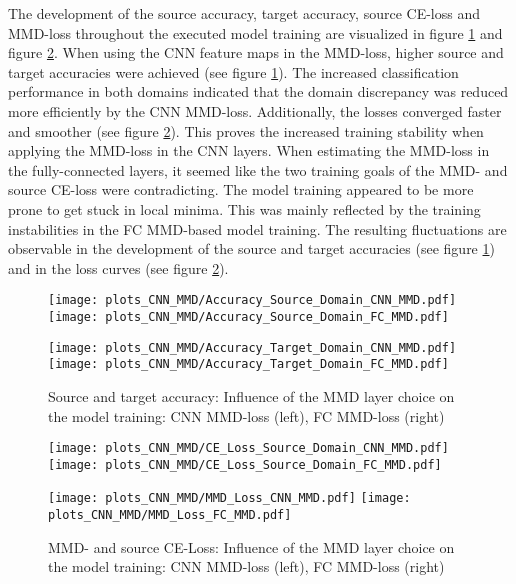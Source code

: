 The development of the source accuracy, target accuracy, source CE-loss and MMD-loss throughout the executed model training are visualized in figure \ref{fig:accuracy_cnn_and_no_cnn_mmd} and figure \ref{fig:loss_cnn_and_no_cnn_mmd}. When using the CNN feature maps in the MMD-loss, higher source and target accuracies were achieved (see figure \ref{fig:accuracy_cnn_and_no_cnn_mmd}). The increased classification performance in both domains indicated that the domain discrepancy was reduced more efficiently by the CNN MMD-loss. Additionally, the losses converged faster and smoother (see figure \ref{fig:loss_cnn_and_no_cnn_mmd}). This proves the increased training stability when applying the MMD-loss in the CNN layers. When estimating the MMD-loss in the fully-connected layers, it seemed like the two training goals of the MMD- and source CE-loss were contradicting. The model training appeared to be more prone to get stuck in local minima. This was mainly reflected by the training instabilities in the FC MMD-based model training. The resulting fluctuations are observable in the development of the source and target accuracies (see figure \ref{fig:accuracy_cnn_and_no_cnn_mmd}) and in the loss curves (see figure \ref{fig:loss_cnn_and_no_cnn_mmd}).

\begin{figure}[htp]
  \centering
  \texttt{[image: plots\_CNN\_MMD/Accuracy\_Source\_Domain\_CNN\_MMD.pdf]}
  \hspace{.3cm}
  \texttt{[image: plots\_CNN\_MMD/Accuracy\_Source\_Domain\_FC\_MMD.pdf]}

  \vspace{.1cm}

  \texttt{[image: plots\_CNN\_MMD/Accuracy\_Target\_Domain\_CNN\_MMD.pdf]}
  \hspace{.3cm}
  \texttt{[image: plots\_CNN\_MMD/Accuracy\_Target\_Domain\_FC\_MMD.pdf]}

  \caption{Source and target accuracy: Influence of the MMD layer choice on the model training: CNN MMD-loss (left), FC MMD-loss (right)}
  \label{fig:accuracy_cnn_and_no_cnn_mmd}
\end{figure}

\begin{figure}[H]
  \centering
  \texttt{[image: plots\_CNN\_MMD/CE\_Loss\_Source\_Domain\_CNN\_MMD.pdf]}
  \hspace{.3cm}
  \texttt{[image: plots\_CNN\_MMD/CE\_Loss\_Source\_Domain\_FC\_MMD.pdf]}

  \vspace{.1cm}

  \texttt{[image: plots\_CNN\_MMD/MMD\_Loss\_CNN\_MMD.pdf]}
  \hspace{.1cm}
  \texttt{[image: plots\_CNN\_MMD/MMD\_Loss\_FC\_MMD.pdf]}

  \caption{MMD- and source CE-Loss: Influence of the MMD layer choice on the model training: CNN MMD-loss (left), FC MMD-loss (right)}
  \label{fig:loss_cnn_and_no_cnn_mmd}
\end{figure}

